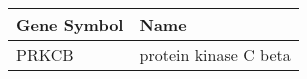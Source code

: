 \begin{tabular}{ll}
\toprule
Gene Symbol &                  Name \\
\midrule
      PRKCB & protein kinase C beta \\
\bottomrule
\end{tabular}
